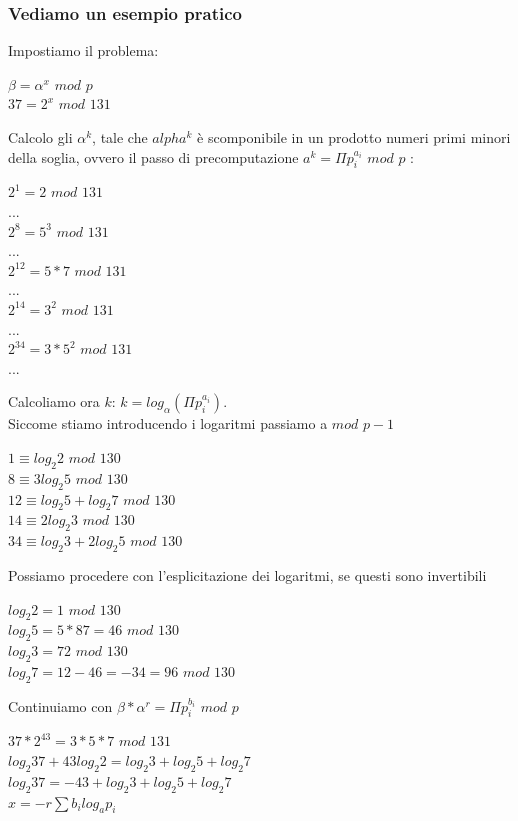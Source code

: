\documentclass[11pt, oneside]{article}   	%
\begin{document}
\subsubsection*{Vediamo un esempio pratico}
Impostiamo il problema:
\begin{center}
$\beta = \alpha ^x $ $mod$ $p$\\
$37 = 2^x$ $mod$ $131$
\end{center}
Calcolo gli $\alpha^k$, tale che $alpha^k$ è scomponibile in un prodotto numeri primi minori della soglia, ovvero il passo di precomputazione $a^k = \Pi p_i^{a_i}$ $mod$ $p$ :
\begin{center}
$2^1 = 2$ $mod$ $131$\\
...\\
$2^8 = 5^3$ $mod$ $131$\\
...\\
$2^12 = 5*7$ $mod$ $131$\\
...\\
$2^14 = 3^2$ $mod$ $131$\\
...\\
$2^34 = 3*5^2$ $mod$ $131$\\
...
\end{center}
Calcoliamo ora $k$: $k = log_\alpha (\Pi p_i ^{a_i})$.\\
Siccome stiamo introducendo i logaritmi passiamo a $mod$ $p-1$
\begin{center}
$1 \equiv log_2 2$ $mod$ $130$\\
$8 \equiv 3log_2 5$ $mod$ $130$\\
$12 \equiv log_2 5 + log_2 7$ $mod$ $130$\\
$14 \equiv 2log_2 3$ $mod$ $130$\\
$34 \equiv log_2 3 + 2log_2 5$ $mod$ $130$
\end{center}
Possiamo procedere con l'esplicitazione dei logaritmi, se questi sono invertibili
\begin{center}
$log_2 2 = 1$ $mod$ $130$\\
$log_2 5 = 5*87 = 46$ $mod$ $130$\\
$log_2 3 = 72$ $mod$ $130$\\
$log_2 7= 12-46 = -34 = 96$ $mod$ $130$\\
\end{center}
Continuiamo con $\beta * \alpha ^ r = \Pi p_i^{b_i}$ $mod$ $p$
\begin{center}
$37 * 2^{43} = 3 *5 * 7$ $mod$ $131$\\
$log_2 37 + 43 log_2 2 = log_2 3 + log_2 5 + log_2 7$\\
$log_2 37 = -43 + log_2 3 + log_2 5+ log_2 7$\\
$ x = -r \sum b_i log_a p_i$
\end{center}
\end{document}
